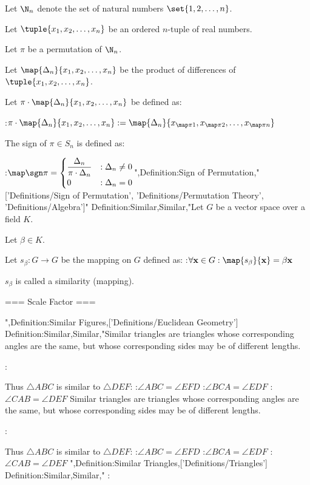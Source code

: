 Let $\N_n$ denote the set of natural numbers $\set {1, 2, \ldots, n}$.

Let $\tuple {x_1, x_2, \ldots, x_n}$ be an ordered $n$-tuple of real numbers.

Let $\pi$ be a permutation of $\N_n$.

Let $\map {\Delta_n} {x_1, x_2, \ldots, x_n}$ be the product of differences of $\tuple {x_1, x_2, \ldots, x_n}$.

Let $\pi \cdot \map {\Delta_n} {x_1, x_2, \ldots, x_n}$ be defined as:

:$\pi \cdot \map {\Delta_n} {x_1, x_2, \ldots, x_n} := \map {\Delta_n} {x_{\map \pi 1}, x_{\map \pi 2}, \ldots, x_{\map \pi n} }$


The sign of $\pi \in S_n$ is defined as:

:$\map \sgn \pi = \begin {cases}
\dfrac {\Delta_n} {\pi \cdot \Delta_n} & : \Delta_n \ne 0 \\
0 & : \Delta_n = 0 \end {cases}$",Definition:Sign of Permutation,"['Definitions/Sign of Permutation', 'Definitions/Permutation Theory', 'Definitions/Algebra']"
Definition:Similar,Similar,"Let $G$ be a vector space over a field $K$.

Let $\beta \in K$.

Let $s_\beta: G \to G$ be the mapping on $G$ defined as:
:$\forall \mathbf x \in G: \map {s_\beta} {\mathbf x} = \beta \mathbf x$


$s_\beta$ is called a similarity (mapping).


=== Scale Factor ===

",Definition:Similar Figures,['Definitions/Euclidean Geometry']
Definition:Similar,Similar,"Similar triangles are triangles whose corresponding angles are the same, but whose corresponding sides may be of different lengths.

:

Thus $\triangle ABC$ is similar to $\triangle DEF$:
:$\angle ABC = \angle EFD$
:$\angle BCA = \angle EDF$
:$\angle CAB = \angle DEF$
Similar triangles are triangles whose corresponding angles are the same, but whose corresponding sides may be of different lengths.

:

Thus $\triangle ABC$ is similar to $\triangle DEF$:
:$\angle ABC = \angle EFD$
:$\angle BCA = \angle EDF$
:$\angle CAB = \angle DEF$
",Definition:Similar Triangles,['Definitions/Triangles']
Definition:Similar,Similar,"
:



